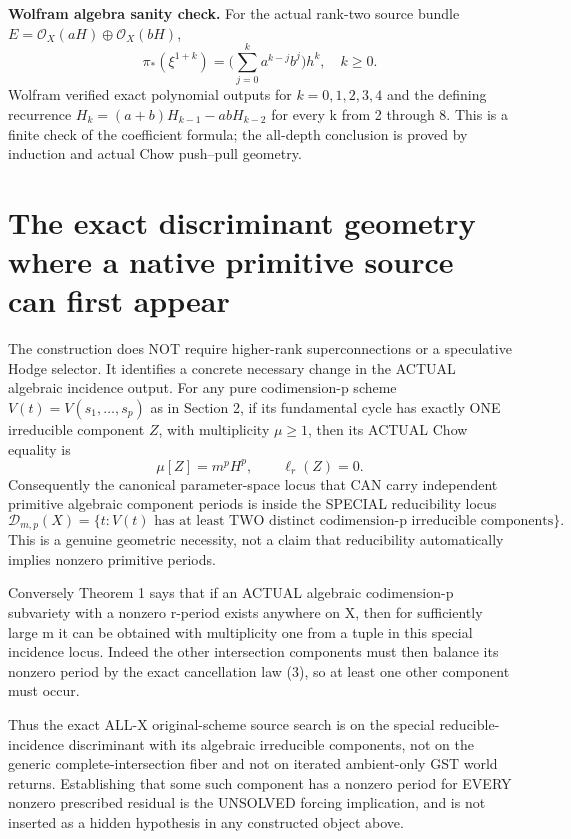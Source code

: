 \documentclass[11pt]{article}
\newcommand{\OO}{\mathcal O}
\begin{document}
\noindent\textbf{Wolfram algebra sanity check.}
For the actual rank-two source bundle
\(E=\OO_X(aH)\oplus\OO_X(bH)\),
\[
 \pi_*(\xi^{1+k})=
 \Big(\sum_{j=0}^ka^{k-j}b^j\Big)h^k,\quad k\ge0.
\]
Wolfram verified exact polynomial outputs for
\(k=0,1,2,3,4\) and the defining recurrence
\(H_k=(a+b)H_{k-1}-abH_{k-2}\)
for every k from 2 through 8.
This is a finite check of the coefficient formula;
the all-depth conclusion is proved by induction and
actual Chow push–pull geometry.

\section{The exact discriminant geometry where a native primitive source can first appear}
The construction does NOT require higher-rank
superconnections or a speculative Hodge selector.
It identifies a concrete necessary change in
the ACTUAL algebraic incidence output.
For any pure codimension-p scheme
\(V(t)=V(s_1,\dots,s_p)\)
as in Section 2, if its fundamental
cycle has exactly ONE irreducible
component \(Z\), with multiplicity \(\mu\ge1\),
then its ACTUAL Chow equality is
\[
 \mu[Z]=m^pH^p,\qquad
 \boxed{\ell_r(Z)=0.}                            \tag{7b}
\]
Consequently the canonical parameter-space locus
that CAN carry independent primitive algebraic
component periods is inside the SPECIAL
reducibility locus
\[
 \mathcal D_{m,p}(X)=
 \{t:V(t)\text{ has at least TWO distinct
               codimension-p irreducible components}\}.
\]
This is a genuine geometric necessity, not
a claim that reducibility automatically implies
nonzero primitive periods.

Conversely Theorem 1 says that if an
ACTUAL algebraic codimension-p subvariety
with a nonzero r-period exists anywhere on X,
then for sufficiently large m it can be
obtained with multiplicity one from a
tuple in this special incidence locus.
Indeed the other intersection components
must then balance its nonzero period by
the exact cancellation law (3), so at least
one other component must occur.

Thus the exact ALL-X original-scheme
source search is on the
special reducible-incidence discriminant
with its algebraic irreducible components,
not on the generic complete-intersection
fiber and not on iterated
ambient-only GST world returns.
Establishing that some such component
has a nonzero period for EVERY
nonzero prescribed residual is the
UNSOLVED forcing implication, and
is not inserted as a hidden hypothesis
in any constructed object above.
\end{document}
